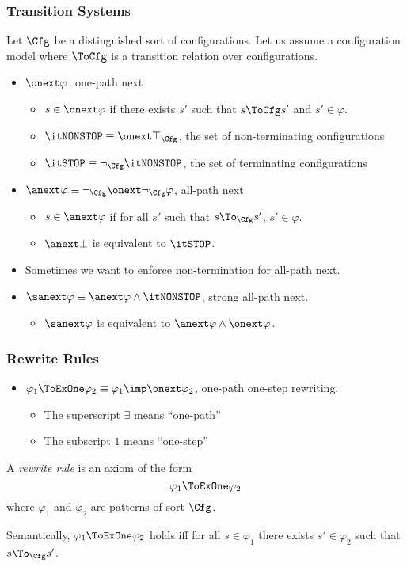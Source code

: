 \begin{frame}
\frametitle{Transition Systems}
Let $\Cfg$ be a distinguished sort of configurations.
Let us assume a configuration model
where $\ToCfg$ is a transition relation over configurations.
\begin{itemize}
\item $\onext \varphi$, one-path next\\
\begin{itemize}
\item $s \in \onext\varphi$ if there exists $s'$ such that
      $s \ToCfg s'$ and $s' \in \varphi$.
\item $\itNONSTOP \equiv \onext \top_\Cfg$,
      the set of non-terminating configurations
\item $\itSTOP \equiv \neg_\Cfg \itNONSTOP$,
      the set of terminating configurations
\end{itemize}
\item $\anext \varphi \equiv \neg_\Cfg \onext \neg_\Cfg \varphi$, all-path next
\begin{itemize}
\item $s \in \anext \varphi$ if for all $s'$ such that
      $s \To_\Cfg s'$, $s' \in \varphi$.
\item $\anext \bot$ is equivalent to $\itSTOP$.
\end{itemize}
\item Sometimes we want to enforce non-termination for all-path next.
\item $\sanext \varphi \equiv \anext \varphi \land \itNONSTOP$,
      strong all-path next.
\begin{itemize}
\item $\sanext \varphi$ is equivalent to $\anext \varphi \land \onext \varphi$.
\end{itemize}
\end{itemize}
\end{frame}

\begin{frame}
\frametitle{Rewrite Rules}
\begin{itemize}
\item $\varphi_1 \ToExOne \varphi_2 \equiv \varphi_1 \imp \onext \varphi_2$,
one-path one-step rewriting.
\begin{itemize}
\item The superscript $\exists$ means ``one-path''
\item The subscript $1$ means ``one-step''
\end{itemize}
\end{itemize}
A \emph{rewrite rule} is an axiom of the form
\[\varphi_1 \ToExOne \varphi_2\]
where $\varphi_1$ and $\varphi_2$ are patterns of sort $\Cfg$.

Semantically, $\varphi_1 \ToExOne \varphi_2$ holds
iff for all $s \in \varphi_1$ there exists $s' \in \varphi_2$ 
such that $s \To_\Cfg s'$.
\end{frame}

